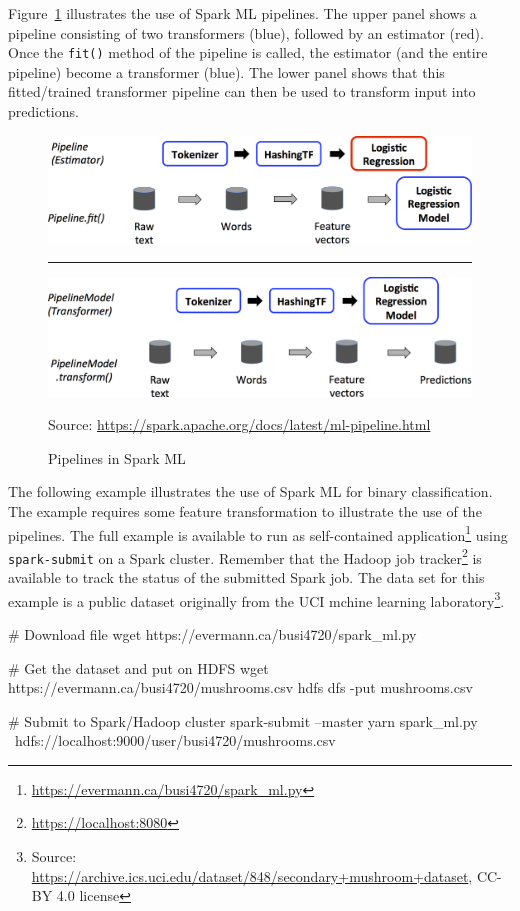 Figure~\ref{fig:sparkpipelines} illustrates the use of Spark ML pipelines. The upper panel shows a pipeline consisting of two transformers (blue), followed by an estimator (red). Once the \texttt{fit()} method of the pipeline is called, the estimator (and the entire pipeline) become a transformer (blue). The lower panel shows that this fitted/trained transformer pipeline can then be used to transform input into predictions. 

\begin{figure}
\centering

\includegraphics[width=.75\textwidth]{ml-Pipeline1.png} 

\vspace{.5\baselineskip}
\rule{.75\textwidth}{.5pt}
\vspace{.5\baselineskip}

\includegraphics[width=.75\textwidth]{ml-Pipeline2.png} 

\scriptsize Source: \url{https://spark.apache.org/docs/latest/ml-pipeline.html} \normalsize
\caption{Pipelines in Spark ML}
\label{fig:sparkpipelines}
\end{figure}

The following example illustrates the use of Spark ML for binary classification. The example requires some feature transformation to illustrate the use of the pipelines. The full example is available to run as self-contained application\footnote{\url{https://evermann.ca/busi4720/spark_ml.py}} using \texttt{spark-submit} on a Spark cluster. Remember that the Hadoop job tracker\footnote{\url{https://localhost:8080}} is available to track the status of the submitted Spark job. The data set for this example is a public dataset originally from the UCI mchine learning laboratory\footnote{Source: \url{https://archive.ics.uci.edu/dataset/848/secondary+mushroom+dataset}, CC-BY 4.0 license}.

\begin{samepage}
\begin{bashcode}
# Download file
wget https://evermann.ca/busi4720/spark_ml.py

# Get the dataset and put on HDFS
wget https://evermann.ca/busi4720/mushrooms.csv
hdfs dfs -put mushrooms.csv

# Submit to Spark/Hadoop cluster
spark-submit --master yarn spark_ml.py \
    hdfs://localhost:9000/user/busi4720/mushrooms.csv
\end{bashcode}
\end{samepage}

